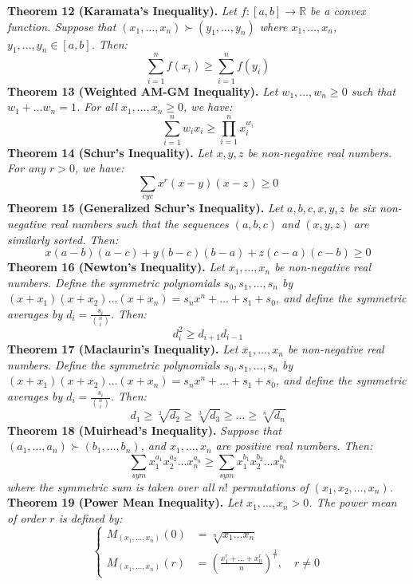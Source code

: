 \documentclass[a4paper,11pt]{article}
\begin{document}
%
%
\textbf{Theorem 12 (Karamata's Inequality).} \textit{Let $f: [a, b] \to \mathbb{R}$ be a convex function. Suppose that $(x_1, \dots, x_n) \succ (y_1, \dots, y_n)$ where $x_1, \dots, x_n$, $y_1, \dots, y_n \in [a, b]$. Then:}
\[
\sum_{i=1}^n f(x_i) \geq \sum_{i=1}^n f(y_i)
\]
%
%
\textbf{Theorem 13 (Weighted AM-GM Inequality).} \textit{Let $w_1, \dots, w_n \geq 0$ such that $w_1 + \dots w_n = 1$. For all $x_1, \dots, x_n \geq 0$, we have:}
\[
\sum_{i=1}^n w_i x_i \geq \prod_{i=1}^n x_i^{w_i}
\]
%
%
\textbf{Theorem 14 (Schur's Inequality).} \textit{Let $x, y, z$ be non-negative real numbers. For any $r > 0$, we have:}
\[
\sum_{cyc} x^r (x - y) (x - z) \geq 0
\]
%
%
\textbf{Theorem 15 (Generalized Schur's Inequality).} \textit{Let $a, b, c, x, y, z$ be six non-negative real numbers such that the sequences $(a, b, c)$ and $(x, y, z)$ are similarly sorted. Then:}
\[
x (a - b) (a - c) + y (b - c) (b - a) + z (c - a) (c - b) \geq 0
\]
%
%
\textbf{Theorem 16 (Newton's Inequality).} \textit{Let $x_1, \dots, x_n$ be non-negative real numbers. Define the symmetric polynomials $s_0, s_1, \dots, s_n$ by $(x + x_1)(x + x_2) \dots (x + x_n) = s_nx^n + \dots + s_1 + s_0$, and define the symmetric averages by $d_i = \frac{s_i}{\binom{n}{i}}$. Then:}
\[
d_i^2 \geq d_{i+1}d_{i-1}
\]
%
%
\textbf{Theorem 17 (Maclaurin's Inequality).} \textit{Let $x_1, \dots, x_n$ be non-negative real numbers. Define the symmetric polynomials $s_0, s_1, \dots, s_n$ by $(x + x_1)(x + x_2) \dots (x + x_n) = s_nx^n + \dots + s_1 + s_0$, and define the symmetric averages by $d_i = \frac{s_i}{\binom{n}{i}}$. Then:}
\[
d_1 \geq \sqrt[2]{d_2} \geq \sqrt[3]{d_3} \geq \dots \geq \sqrt[n]{d_n}
\]
%
%
\textbf{Theorem 18 (Muirhead's Inequality).} \textit{Suppose that $(a_1, \dots, a_n) \succ (b_1, \dots, b_n)$, and $x_1, \dots, x_n$ are positive real numbers. Then:}
\[
\sum_{sym} x_1^{a_1} x_2^{a_2} \dots x_n^{a_n} \geq \sum_{sym} x_1^{b_1} x_2^{b_2} \dots x_n^{b_n}
\]
\textit{where the symmetric sum is taken over all $n!$ permutations of $(x_1, x_2, \dots, x_n)$.} \\[10pt]
%
%
\textbf{Theorem 19 (Power Mean Inequality).} \textit{Let $x_1, \dots, x_n > 0$. The power mean of order $r$ is defined by:}
\[
\left\{
\begin{aligned}
  M_{(x_1, \dots, x_n)}(0) &= \sqrt[n]{x_1 \dots x_n} \\
  M_{(x_1, \dots, x_n)}(r) &= \left( \frac{x_1^r + \dots + x_n^r}{n} \right)^\frac{1}{r}, \quad r \neq 0
\end{aligned}
\right.
\]
\end{document}
